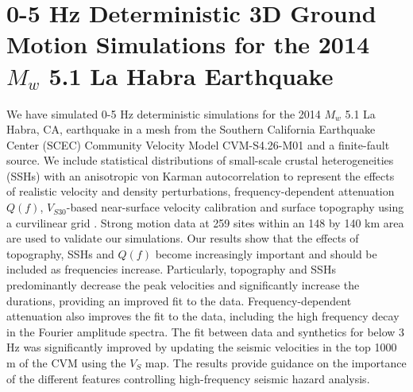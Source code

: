 
\linespread{1.7}
\chapter{0-5 Hz Deterministic 3D Ground Motion Simulations for the 2014 $M_w$ 5.1 La Habra Earthquake}
\linespread{2.0}
\label{chap:highf}

\graphicspath{{/Users/zhh076/work/PhD_way/high_f/}}

We have simulated 0-5 Hz deterministic simulations for the 2014 $M_w$ 5.1 La Habra, CA, earthquake in a mesh from the Southern California Earthquake Center (SCEC) Community Velocity Model CVM-S4.26-M01 and a finite-fault source. We include statistical distributions of small-scale crustal heterogeneities (SSHs) with an anisotropic von Karman autocorrelation to represent the effects of realistic velocity and density perturbations, frequency-dependent attenuation $Q(f)$, $V_{S30}$-based near-surface velocity calibration and surface topography using a curvilinear grid \citep{oreillyHighorderFiniteDifference2021}. Strong motion data at 259 sites within an 148 by 140 km area are used to validate our simulations. Our results show that the effects of topography, SSHs and $Q(f)$ become increasingly important and should be included as frequencies increase. Particularly, topography and SSHs predominantly decrease the peak velocities and significantly increase the durations, providing an improved fit to the data. Frequency-dependent attenuation also improves the fit to the data, including the high frequency decay in the Fourier amplitude spectra. The fit between data and synthetics for below 3 Hz was significantly improved by updating the seismic velocities in the top 1000 m of the CVM using the \citet{thompsonUpdatedVs30Map2018} $V_S$ map. The results provide guidance on the importance of the different features controlling high-frequency seismic hazard analysis.



